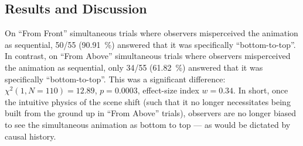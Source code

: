 \subsection{Results and Discussion}
On “From Front” simultaneous trials where observers misperceived the animation as sequential, 50/55 (\qty{90.91}{\percent}) answered that it was specifically “bottom-to-top”.  In contrast, on “From Above” simultaneous trials where observers misperceived the animation as sequential, only 34/55 (\qty{61.82}{\percent}) answered that it was specifically “bottom-to-top”.  This was a significant difference:  $\chi^2 (1, N = 110) = 12.89$, $p = 0.0003$, effect-size index $w = 0.34$.  In short, once the intuitive physics of the scene shift (such that it no longer necessitates being built from the ground up in “From Above” trials), observers are no longer biased to see the simultaneous animation as bottom to top --- as would be dictated by causal history.

